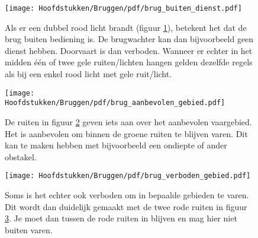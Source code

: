 \vspace{-0.75cm}
\begin{figure}[H]
	\centering
	\begin{minipage}[b]{0.18\textwidth}
		\texttt{[image: Hoofdstukken/Bruggen/pdf/brug\_buiten\_dienst.pdf]}
		\caption{}
		\label{pic:brug:buiten}
	\end{minipage}
	\hfill
	\begin{minipage}[t]{0.75\textwidth}
		\vspace{-2.5cm}
		Als er een dubbel rood licht brandt (figuur \ref{pic:brug:buiten}), betekent het dat de brug buiten bediening is. De brugwachter kan dan bijvoorbeeld geen dienst hebben. Doorvaart is dan verboden. Wanneer er echter in het midden één of twee gele ruiten/lichten hangen gelden dezelfde regels als bij een enkel rood licht met gele ruit/licht.
	\end{minipage}
\end{figure}
\vspace{-0.75cm}
\begin{figure}[H]
	\centering
	\begin{minipage}[b]{0.18\textwidth}
		\texttt{[image: Hoofdstukken/Bruggen/pdf/brug\_aanbevolen\_gebied.pdf]}
		\caption{}
		\label{pic:brug:gebied}
	\end{minipage}
	\hfill
	\begin{minipage}[t]{0.75\textwidth}
		\vspace{-2.5cm}
		De ruiten in figuur \ref{pic:brug:gebied} geven iets aan over het aanbevolen vaargebied. Het is aanbevolen om binnen de groene ruiten te blijven varen. Dit kan te maken hebben met bijvoorbeeld een ondiepte of ander obstakel.
	\end{minipage}
\end{figure}
\vspace{-0.75cm}
\begin{figure}[H]
\centering
\begin{minipage}[b]{0.18\textwidth}
	\texttt{[image: Hoofdstukken/Bruggen/pdf/brug\_verboden\_gebied.pdf]}
	\caption{}
	\label{pic:brug:gebied_verbod}
\end{minipage}
\hfill
\begin{minipage}[t]{0.75\textwidth}
	\vspace{-2.5cm}
	Soms is het echter ook verboden om in bepaalde gebieden te varen. Dit wordt dan duidelijk gemaakt met de twee rode ruiten in figuur \ref{pic:brug:gebied_verbod}. Je moet dan tussen de rode ruiten in blijven en mag hier niet buiten varen.
\end{minipage}
\end{figure}

